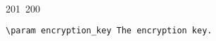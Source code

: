 201~200~\documentclass{article}
\begin{document}
\begin{lstlisting}[language=Python, caption=Decrypting a Message with ChaCha20-Poly1305]
	                                                                                                                                                                                                                                                                                                	                                                                                                                                        	    	                                                                                                	                                                                                                                                                                                                                                                                                                                                	                                                                        	                                                                        	                                                                                                                                        	                                                                                                                                                                                                                        	                                                                                                                            	                                                                	                                                                                                                                                        \param encryption_key The encryption key.

\end{lstlisting}
\end{document}
